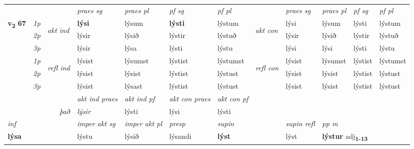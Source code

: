 \begin{longtable}[l]{X>{\footnotesize\itshape}llXXXXlXXXX}
\midrule

 & &   & \textit{praes sg}  & \textit{praes pl}    & \textit{ pf sg} & \textit{pf pl} & & \textit{praes sg}  & \textit{praes pl}    & \textit{pf sg} & \textit{pf pl }  \\ \cmidrule{4-7} \cmidrule{9-12}
 \multirow{2}{*}{{{\textbf{v{\textsubscript{2}}} \Large{\textbf{67}}}}}  & 1p & \multirow{3}{*}{\begin{turn}{90}\textit{akt ind}\end{turn}} & \textbf{lýsi} & lýsum & \textbf{lýsti} & lýstum & \multirow{3}{*}{\begin{turn}{90}\textit{akt con}\end{turn}} &lýsi & lýsum & lýsti & lýstum\\*
 & 2p &  &  lýsir  & lýsið & lýstir & lýstuð & & lýsir & lýsið & lýstir & lýstuð \\*
 & 3p &  & lýsir & lýsa & lýsti & lýstu & & lýsi & lýsi& lýsti & lýstu \\*
\cmidrule{4-7} \cmidrule{9-12}
 & 1p & \multirow{3}{*}{\begin{turn}{90}\textit{refl ind}\end{turn}}  & lýsist & lýsumst & lýstist & lýstumst & \multirow{3}{*}{\begin{turn}{90}\textit{refl con}\end{turn}}  &lýsist & lýsumst & lýstist & lýstumst \\*
 & 2p &  & lýsist & lýsist & lýstist & lýstust & &lýsist & lýsist & lýstist & lýstust \\*
 & 3p  & & lýsist & lýsast & lýstist & lýstust & & lýsist & lýsist& lýstist & lýstust \\*
\cmidrule{4-7} \cmidrule{9-12}

   && &  \textit{akt ind praes} & \textit{akt ind pf} & \textit{akt con praes} & \textit{akt con pf} \\*
\multicolumn{3}{r}{\textit{það}} & lýsir & lýsti & lýsi & lýsti \\*

\cmidrule{4-7}
   {\textit{inf}} & &  & \textit{imper akt sg} & \textit{imper akt pl}   & \textit{presp} & \textit{supin} && \textit{supin refl} & \textit{pp m} \\*
  {\textbf{lýsa}} & && lýstu  & lýsið   & lýsandi &  \textbf{lýst} && lýst & \multicolumn{2}{l}{\textbf{lýstur} adj\textbf{\textsubscript{1-13}}} \\*


\end{longtable}
